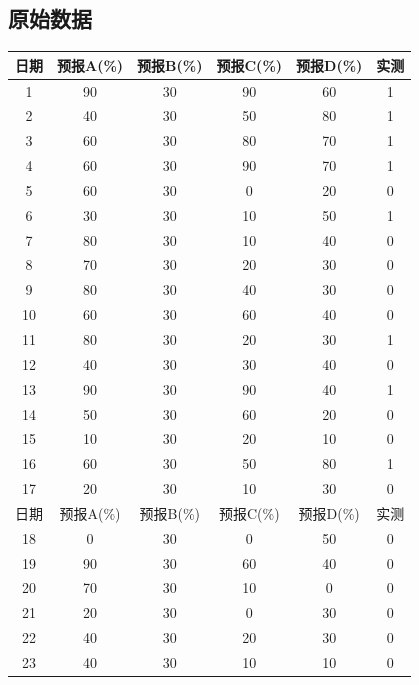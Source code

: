 \documentclass[a4paper,12pt,onecolumn,twoside]{article}
\begin{document}
\subsection{原始数据}
\begin{longtable}{cccccc} 
		\hline
		日期 & 预报A(\%) & 预报B(\%) & 预报C(\%) & 预报D(\%) & 实测  \\ 
		\hline
		1  & 90      & 30      & 90      & 60      & 1   \\
		2  & 40      & 30      & 50      & 80      & 1   \\
		3  & 60      & 30      & 80      & 70      & 1   \\
		4  & 60      & 30      & 90      & 70      & 1   \\
		5  & 60      & 30      & 0       & 20      & 0   \\
		6  & 30      & 30      & 10      & 50      & 1   \\
		7  & 80      & 30      & 10      & 40      & 0   \\
		8  & 70      & 30      & 20      & 30      & 0   \\
		9  & 80      & 30      & 40      & 30      & 0   \\
		10 & 60      & 30      & 60      & 40      & 0   \\
		11 & 80      & 30      & 20      & 30      & 1   \\
		12 & 40      & 30      & 30      & 40      & 0   \\
		13 & 90      & 30      & 90      & 40      & 1   \\
		14 & 50      & 30      & 60      & 20      & 0   \\
		15 & 10      & 30      & 20      & 10      & 0   \\
		16 & 60      & 30      & 50      & 80      & 1   \\
		17 & 20      & 30      & 10      & 30      & 0   \\
		\hline
		\hline
		日期 & 预报A(\%) & 预报B(\%) & 预报C(\%) & 预报D(\%) & 实测  \\ 
		\hline
		18 & 0       & 30      & 0       & 50      & 0   \\
		19 & 90      & 30      & 60      & 40      & 0   \\
		20 & 70      & 30      & 10      & 0       & 0   \\
		21 & 20      & 30      & 0       & 30      & 0   \\
		22 & 40      & 30      & 20      & 30      & 0   \\
		23 & 40      & 30      & 10      & 10      & 0   \\

\end{longtable}
\end{document}

